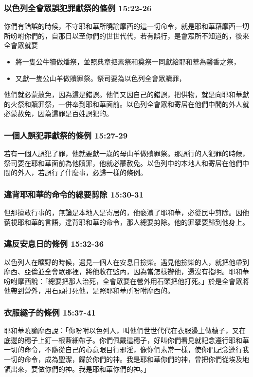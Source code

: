 \subsubsection{以色列全會眾誤犯罪獻祭的條例 15:22-26}
你們有錯誤的時候，不守耶和華所曉諭摩西的這一切命令，就是耶和華藉摩西一切所吩咐你們的，自那日以至你們的世世代代，若有誤行，是會眾所不知道的，後來全會眾就要
\vspace*{-2mm}
\begin{itemize} 
\itemsep-.35em
\item 將一隻公牛犢做燔祭，並照典章把素祭和奠祭一同獻給耶和華為馨香之祭，
\item 又獻一隻公山羊做贖罪祭。祭司要為以色列全會眾贖罪，
\end{itemize}
\vspace*{-2mm}
他們就必蒙赦免，因為這是錯誤。他們又因自己的錯誤，把供物，就是向耶和華獻的火祭和贖罪祭，一併奉到耶和華面前。以色列全會眾和寄居在他們中間的外人就必蒙赦免，因為這罪是百姓誤犯的。

\subsubsection{一個人誤犯罪獻祭的條例 15:27-29}
若有一個人誤犯了罪，他就要獻一歲的母山羊做贖罪祭。那誤行的人犯罪的時候，祭司要在耶和華面前為他贖罪，他就必蒙赦免。以色列中的本地人和寄居在他們中間的外人，若誤行了什麼事，必歸一樣的條例。

\subsubsection{違背耶和華的命令的總要剪除 15:30-31}
但那擅敢行事的，無論是本地人是寄居的，他褻瀆了耶和華，必從民中剪除。因他藐視耶和華的言語，違背耶和華的命令，那人總要剪除。他的罪孽要歸到他身上。

\subsubsection{違反安息日的條例 15:32-36 }
以色列人在曠野的時候，遇見一個人在安息日撿柴。遇見他撿柴的人，就把他帶到摩西、亞倫並全會眾那裡，將他收在監內，因為當怎樣辦他，還沒有指明。耶和華吩咐摩西說：「總要把那人治死，全會眾要在營外用石頭把他打死。」於是全會眾將他帶到營外，用石頭打死他，是照耶和華所吩咐摩西的。

\subsubsection{衣服繸子的條例 15:37-41 }
耶和華曉諭摩西說：「你吩咐以色列人，叫他們世世代代在衣服邊上做穗子，又在底邊的穗子上釘一根藍細帶子。你們佩戴這穗子，好叫你們看見就記念遵行耶和華一切的命令，不隨從自己的心意眼目行邪淫，像你們素常一樣，使你們記念遵行我一切的命令，成為聖潔，歸於你們的神。我是耶和華你們的神，曾把你們從埃及地領出來，要做你們的神。我是耶和華你們的神。」

